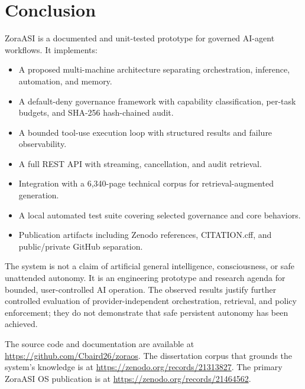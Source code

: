 \documentclass[11pt]{article}
\begin{document}
\section{Conclusion}

ZoraASI is a documented and unit-tested prototype for governed AI-agent workflows. It implements:

\begin{itemize}[leftmargin=*]
  \item A proposed multi-machine architecture separating orchestration, inference, automation, and memory.
  \item A default-deny governance framework with capability classification, per-task budgets, and SHA-256 hash-chained audit.
  \item A bounded tool-use execution loop with structured results and failure observability.
  \item A full REST API with streaming, cancellation, and audit retrieval.
  \item Integration with a 6,340-page technical corpus for retrieval-augmented generation.
  \item A local automated test suite covering selected governance and core behaviors.
  \item Publication artifacts including Zenodo references, CITATION.cff, and public/private GitHub separation.
\end{itemize}

The system is not a claim of artificial general intelligence, consciousness, or safe unattended autonomy. It is an engineering prototype and research agenda for bounded, user-controlled AI operation. The observed results justify further controlled evaluation of provider-independent orchestration, retrieval, and policy enforcement; they do not demonstrate that safe persistent autonomy has been achieved.

The source code and documentation are available at \url{https://github.com/Cbaird26/zoraos}. The dissertation corpus that grounds the system's knowledge is at \url{https://zenodo.org/records/21313827}. The primary ZoraASI OS publication is at \url{https://zenodo.org/records/21464562}.



\end{document}
